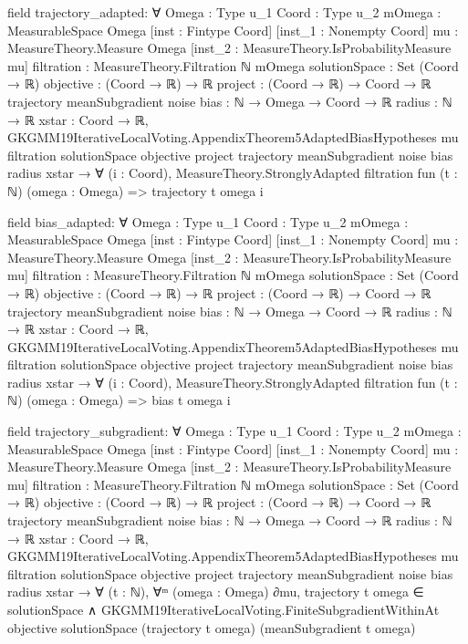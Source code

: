 \documentclass[10pt]{article}
\begin{document}
\begin{ReviewVerbatim}
field trajectory_adapted:
∀ {Omega : Type u_1} {Coord : Type u_2} {mOmega : MeasurableSpace Omega} [inst : Fintype Coord]
  [inst_1 : Nonempty Coord] {mu : MeasureTheory.Measure Omega} [inst_2 : MeasureTheory.IsProbabilityMeasure mu]
  {filtration : MeasureTheory.Filtration ℕ mOmega} {solutionSpace : Set (Coord → ℝ)} {objective : (Coord → ℝ) → ℝ}
  {project : (Coord → ℝ) → Coord → ℝ} {trajectory meanSubgradient noise bias : ℕ → Omega → Coord → ℝ} {radius : ℕ → ℝ}
  {xstar : Coord → ℝ},
  GKGMM19IterativeLocalVoting.AppendixTheorem5AdaptedBiasHypotheses mu filtration solutionSpace objective project
      trajectory meanSubgradient noise bias radius xstar →
    ∀ (i : Coord), MeasureTheory.StronglyAdapted filtration fun (t : ℕ) (omega : Omega) => trajectory t omega i

field bias_adapted:
∀ {Omega : Type u_1} {Coord : Type u_2} {mOmega : MeasurableSpace Omega} [inst : Fintype Coord]
  [inst_1 : Nonempty Coord] {mu : MeasureTheory.Measure Omega} [inst_2 : MeasureTheory.IsProbabilityMeasure mu]
  {filtration : MeasureTheory.Filtration ℕ mOmega} {solutionSpace : Set (Coord → ℝ)} {objective : (Coord → ℝ) → ℝ}
  {project : (Coord → ℝ) → Coord → ℝ} {trajectory meanSubgradient noise bias : ℕ → Omega → Coord → ℝ} {radius : ℕ → ℝ}
  {xstar : Coord → ℝ},
  GKGMM19IterativeLocalVoting.AppendixTheorem5AdaptedBiasHypotheses mu filtration solutionSpace objective project
      trajectory meanSubgradient noise bias radius xstar →
    ∀ (i : Coord), MeasureTheory.StronglyAdapted filtration fun (t : ℕ) (omega : Omega) => bias t omega i

field trajectory_subgradient:
∀ {Omega : Type u_1} {Coord : Type u_2} {mOmega : MeasurableSpace Omega} [inst : Fintype Coord]
  [inst_1 : Nonempty Coord] {mu : MeasureTheory.Measure Omega} [inst_2 : MeasureTheory.IsProbabilityMeasure mu]
  {filtration : MeasureTheory.Filtration ℕ mOmega} {solutionSpace : Set (Coord → ℝ)} {objective : (Coord → ℝ) → ℝ}
  {project : (Coord → ℝ) → Coord → ℝ} {trajectory meanSubgradient noise bias : ℕ → Omega → Coord → ℝ} {radius : ℕ → ℝ}
  {xstar : Coord → ℝ},
  GKGMM19IterativeLocalVoting.AppendixTheorem5AdaptedBiasHypotheses mu filtration solutionSpace objective project
      trajectory meanSubgradient noise bias radius xstar →
    ∀ (t : ℕ),
      ∀ᵐ (omega : Omega) ∂mu,
        trajectory t omega ∈ solutionSpace ∧
          GKGMM19IterativeLocalVoting.FiniteSubgradientWithinAt objective solutionSpace (trajectory t omega)
            (meanSubgradient t omega)


\end{ReviewVerbatim}
\end{document}
